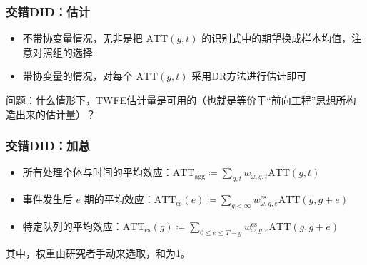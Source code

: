 \documentclass[../didNotes.tex]{subfiles}
\begin{document}
\begin{frame}
  \frametitle{交错DID：估计}

  \begin{itemize}
    \item 不带协变量情况，无非是把 $\text{ATT}(g,t)$ 的识别式中的期望换成样本均值，注意对照组的选择
    \item 带协变量的情况，对每个 $\text{ATT}(g,t)$ 采用DR方法进行估计即可
  \end{itemize}

  问题：什么情形下，TWFE估计量是可用的（也就是等价于``前向工程''思想所构造出来的估计量）？

\end{frame}

\begin{frame}
  \frametitle{交错DID：加总}

  \begin{itemize}
    \item 所有处理个体与时间的平均效应：\( \text{ATT}_{\text{agg}}
      \coloneqq \sum_{g,t} w_{\omega, g,t} \text{ATT}(g,t) \)
    \item 事件发生后 \( e \) 期的平均效应：\(
        \text{ATT}_{\text{es}}(e) \coloneqq \sum_{g < \infty} w^{\text{es}}_{\omega, g, e}
      \text{ATT}(g,g+e)  \)
    \item 特定队列的平均效应：\( \text{ATT}_{\text{es}}(g) \coloneqq
      \sum_{0 \le e \le T-g} w^{\text{es}}_{\omega, g, e} \text{ATT}(g,g+e)  \)
  \end{itemize}

  其中，权重由研究者手动来选取，和为1。
\end{frame}
\end{document}
